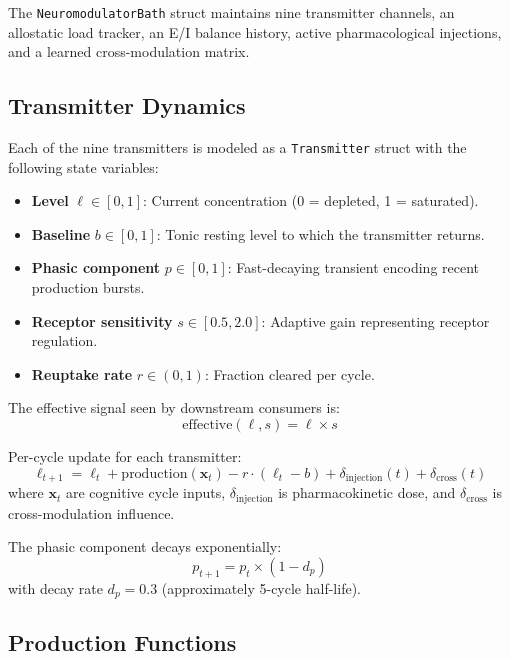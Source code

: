 \documentclass[11pt,a4paper]{article}
\begin{document}
The \texttt{NeuromodulatorBath} struct maintains nine transmitter channels, an allostatic load tracker, an E/I balance history, active pharmacological injections, and a learned cross-modulation matrix.

\subsection{Transmitter Dynamics}

Each of the nine transmitters is modeled as a \texttt{Transmitter} struct with the following state variables:

\begin{itemize}
  \item \textbf{Level} $\ell \in [0, 1]$: Current concentration (0 = depleted, 1 = saturated).
  \item \textbf{Baseline} $b \in [0, 1]$: Tonic resting level to which the transmitter returns.
  \item \textbf{Phasic component} $p \in [0, 1]$: Fast-decaying transient encoding recent production bursts.
  \item \textbf{Receptor sensitivity} $s \in [0.5, 2.0]$: Adaptive gain representing receptor regulation.
  \item \textbf{Reuptake rate} $r \in (0, 1)$: Fraction cleared per cycle.
\end{itemize}

The effective signal seen by downstream consumers is:
\begin{equation}
  \text{effective}(\ell, s) = \ell \times s
\end{equation}

\noindent Per-cycle update for each transmitter:
\begin{equation}
  \ell_{t+1} = \ell_t + \text{production}(\mathbf{x}_t) - r \cdot (\ell_t - b) + \delta_{\text{injection}}(t) + \delta_{\text{cross}}(t)
\end{equation}
where $\mathbf{x}_t$ are cognitive cycle inputs, $\delta_{\text{injection}}$ is pharmacokinetic dose, and $\delta_{\text{cross}}$ is cross-modulation influence.

The phasic component decays exponentially:
\begin{equation}
  p_{t+1} = p_t \times (1 - d_p)
\end{equation}
with decay rate $d_p = 0.3$ (approximately 5-cycle half-life).

\subsection{Production Functions}
\end{document}
